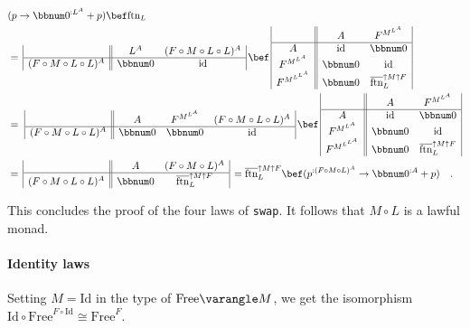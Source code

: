 \begin{align*}
 & (p\rightarrow\bbnum 0^{:L^{A}}+p)\bef\text{ftn}_{L}\\
 & =\,\begin{array}{|c||cc|}
 & L^{A} & (F\circ M\circ L\circ L)^{A}\\
\hline (F\circ M\circ L\circ L)^{A} & \bbnum 0 & \text{id}
\end{array}\,\bef\,\begin{array}{|c||cc|}
 & A & F^{M^{L^{A}}}\\
\hline A & \text{id} & \bbnum 0\\
F^{M^{L^{A}}} & \bbnum 0 & \text{id}\\
F^{M^{L^{L^{A}}}} & \bbnum 0 & \overline{\text{ftn}}_{L}^{\uparrow M\uparrow F}
\end{array}\\
 & =\,\,\begin{array}{|c||ccc|}
 & A & F^{M^{L^{A}}} & (F\circ M\circ L\circ L)^{A}\\
\hline (F\circ M\circ L\circ L)^{A} & \bbnum 0 & \bbnum 0 & \text{id}
\end{array}\,\bef\,\begin{array}{|c||cc|}
 & A & F^{M^{L^{A}}}\\
\hline A & \text{id} & \bbnum 0\\
F^{M^{L^{A}}} & \bbnum 0 & \text{id}\\
F^{M^{L^{L^{A}}}} & \bbnum 0 & \overline{\text{ftn}}_{L}^{\uparrow M\uparrow F}
\end{array}\\
 & =\,\begin{array}{|c||cc|}
 & A & (F\circ M\circ L)^{A}\\
\hline (F\circ M\circ L\circ L)^{A} & \bbnum 0 & \overline{\text{ftn}}_{L}^{\uparrow M\uparrow F}
\end{array}\,=\overline{\text{ftn}}_{L}^{\uparrow M\uparrow F}\bef(p^{:(F\circ M\circ L)^{A}}\rightarrow\bbnum 0^{:A}+p)\quad.
\end{align*}

This concludes the proof of the four laws of \lstinline!swap!. It
follows that $M\circ L$ is a lawful monad.

\paragraph{Identity laws}

Setting $M=\text{Id}$ in the type of $\text{Free}\varangle M$, we
get the isomorphism $\text{Id}\circ\text{Free}^{F\circ\text{Id}}\cong\text{Free}^{F}$.

